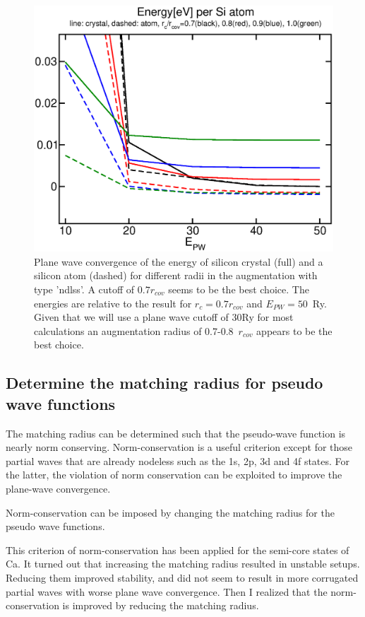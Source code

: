 \documentclass[11pt,a4paper]{report}
\begin{document}
\begin{figure}[h!]
\begin{center}
\includegraphics[width=0.5\linewidth]
{Figs/Siepwconvndlessrad/etotofepwofrcl.eps}
\end{center}
\caption{\label{fig:epwconvsindlss} Plane wave convergence of the
  energy of silicon crystal (full) and a silicon atom (dashed) for
  different radii in the augmentation with type 'ndlss'. A cutoff of
  $0.7 r_{cov}$ seems to be the best choice. The energies are relative
  to the result for $r_c=0.7 r_{cov}$ and $E_{PW}=50$~Ry. Given that
  we will use a plane wave cutoff of 30Ry for most calculations an
  augmentation radius of 0.7-0.8~$r_{cov}$ appears to be the best choice.}
\end{figure}

\subsection{Determine the matching radius for pseudo wave functions}
\label{sec:determinepseudocutoff}
The matching radius can be determined such that the pseudo-wave
function is nearly norm conserving.  Norm-conservation is a useful
criterion except for those partial waves that are already nodeless
such as the 1s, 2p, 3d and 4f states. For the latter, the violation of
norm conservation can be exploited to improve the plane-wave
convergence.

Norm-conservation can be imposed by changing the matching radius for
the pseudo wave functions.

This criterion of norm-conservation has been applied for the semi-core
states of Ca. It turned out that increasing the matching radius
resulted in unstable setups. Reducing them improved stability, and did
not seem to result in more corrugated partial waves with worse plane
wave convergence.  Then I realized that the norm-conservation is
improved by reducing the matching radius.
\end{document}
